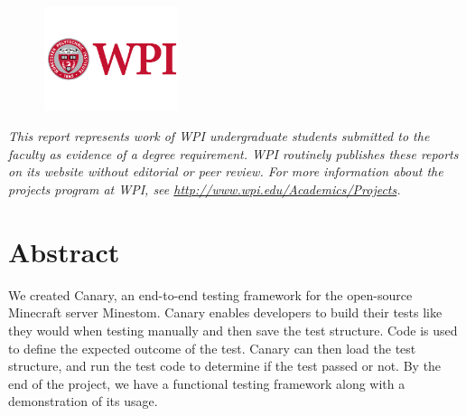 \documentclass[12pt]{article}
\begin{document}
\begin{center}
\begin{figure}[H]
    \includegraphics[width=0.35\textwidth]{Images/logo.png} %
    \end{figure}
    \small{\textit{This report represents work of WPI undergraduate students submitted to the faculty as evidence of a degree requirement. WPI routinely publishes these reports on its website without editorial or peer review. For more information about the projects program at WPI, see \url{http://www.wpi.edu/Academics/Projects}.}} %
\end{center}


\newpage %
\setcounter{page}{1} %

\section*{Abstract} %

We created Canary, an end-to-end testing framework for the open-source
Minecraft server Minestom. Canary enables developers to build their
tests like they would when testing manually and then save the test
structure. Code is used to define the expected outcome of the test.
Canary can then load the test structure, and run the test code to
determine if the test passed or not. By the end of the project, we have
a functional testing framework along with a demonstration of its usage.
\end{document}
